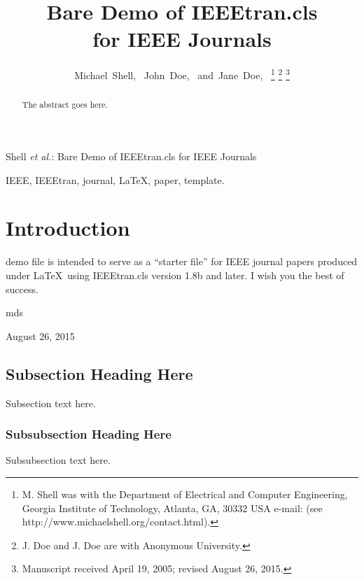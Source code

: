 \documentclass[journal]{IEEEtran}
\begin{document}
	
	\title{Bare Demo of IEEEtran.cls\\ for IEEE Journals}
	
	\author{Michael~Shell,~
		John~Doe,~
		and~Jane~Doe,~%
		\thanks{M. Shell was with the Department
			of Electrical and Computer Engineering, Georgia Institute of Technology, Atlanta,
			GA, 30332 USA e-mail: (see http://www.michaelshell.org/contact.html).}%
		\thanks{J. Doe and J. Doe are with Anonymous University.}%
		\thanks{Manuscript received April 19, 2005; revised August 26, 2015.}}
	
	{Shell \MakeLowercase{\textit{et al.}}: Bare Demo of IEEEtran.cls for IEEE Journals}
	
	\maketitle
	
	\begin{abstract}
		The abstract goes here.
	\end{abstract}
	
	\begin{IEEEkeywords}
		IEEE, IEEEtran, journal, \LaTeX, paper, template.
	\end{IEEEkeywords}
	
	\IEEEpeerreviewmaketitle
	
	\section{Introduction}
	
	 demo file is intended to serve as a ``starter file''
	for IEEE journal papers produced under \LaTeX\ using
	IEEEtran.cls version 1.8b and later.
	I wish you the best of success.
	
	\hfill mds
	
	\hfill August 26, 2015
	
	\subsection{Subsection Heading Here}
	Subsection text here.
	
	\subsubsection{Subsubsection Heading Here}
	Subsubsection text here.
	
\end{document}
